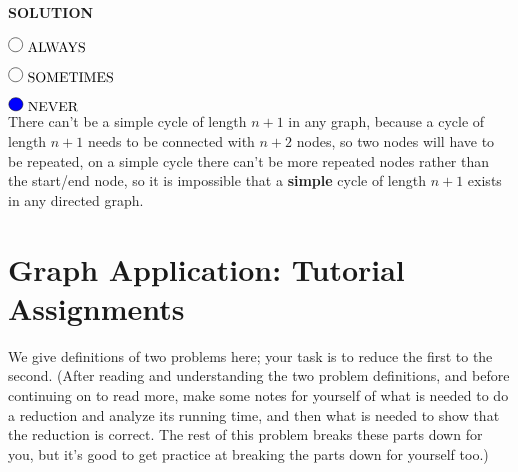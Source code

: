 \documentclass[11pt]{article}
\def\ans#1{{\color{ans}#1}}
\newcommand{\fillinMC}[1]{\fillinMCmath{\mbox{#1}}}
\newcommand{\fillinMCmath}[1]{\begin{tikzpicture}\draw circle [radius=0.5em];\end{tikzpicture}\ #1}
\newcommand{\fillinMCsoln}[1]{\fillinMCmathsoln{\mbox{#1}}}
\newcommand{\fillinMCmathsoln}[1]{\begin{tikzpicture}\draw[black, fill=blue] circle [radius=0.5em];\end{tikzpicture}\ #1}
\begin{document}
\begin{enumerate}
\textbf{SOLUTION}

$\fillinMC{ALWAYS}$

$\fillinMC{SOMETIMES}$

$\fillinMCsoln{NEVER}$\\
\ans{
  There can't be a simple cycle of length $n + 1$ in any graph, 
  because a cycle of length $n + 1$ needs to be connected with $n + 2$ nodes, so two nodes 
  will have to be repeated, on a simple cycle there can't be more repeated nodes rather 
  than the start/end node, so it is impossible that a \textbf{simple} cycle of length 
  $n+1$ exists in any directed graph.
}
\end{enumerate}

\section{Graph Application: Tutorial Assignments}
\label{sec-3}
We give definitions of two problems here; your task is to reduce the
first to the second. (After reading and understanding the two problem
definitions, and before continuing on to read more, make some notes
for yourself of what is needed to do a reduction and analyze its
running time, and then what is needed to show that the reduction is
correct. The rest of this problem breaks these parts down for you, but
it's good to get practice at breaking the parts down for yourself
too.)
\end{document}

